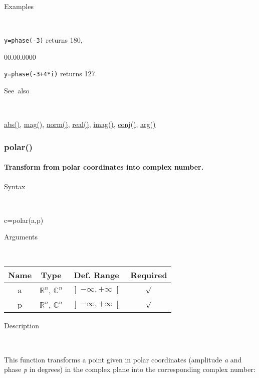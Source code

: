 \begin{description}
\item [Examples]~
\end{description}
\texttt{y=phase(-3)} returns 180,

\begin{lyxlist}{00.00.0000}
\item [\texttt{y=phase(-3+4{*}i)}]returns 127.
\end{lyxlist}
\begin{description}
\item [See~also]~
\end{description}
\textcolor{blue}{\hyperlink{abs}{abs()}}, \textcolor{blue}{\hyperlink{mag}{mag()}},
\textcolor{blue}{\hyperlink{norm}{norm()}}, \textcolor{blue}{\hyperlink{real}{real()}},
\textcolor{blue}{\hyperlink{imag}{imag()}}, \textcolor{blue}{\hyperlink{conj}{conj()}},
\textcolor{blue}{\hyperlink{arg}{arg()}}


\newpage
\subsubsection*{\hypertarget{polar}{}{\Large polar()}}


\paragraph{\label{par:polar}Transform from polar coordinates into complex number.}

\begin{description}
\item [Syntax]~
\end{description}
c=polar(a,p)

\begin{description}
\item [Arguments]~
\end{description}
\begin{tabular}{|c|c|c|c|}
\hline 
Name&
Type&
Def. Range&
Required\tabularnewline
\hline
\hline 
a&
$\mathbb{R}^{n}$, $\mathbb{C}^{n}$&
$\left]-\infty,+\infty\right[$&
$\surd$\tabularnewline
\hline
p&
$\mathbb{R}^{n}$, $\mathbb{C}^{n}$&
$\left]-\infty,+\infty\right[$&
$\surd$\tabularnewline
\hline
\end{tabular}

\begin{description}
\item [Description]~
\end{description}
This function transforms a point given in polar coordinates (amplitude
\textit{a} and phase \textit{p} in degrees) in the complex plane into
the corresponding complex number:

